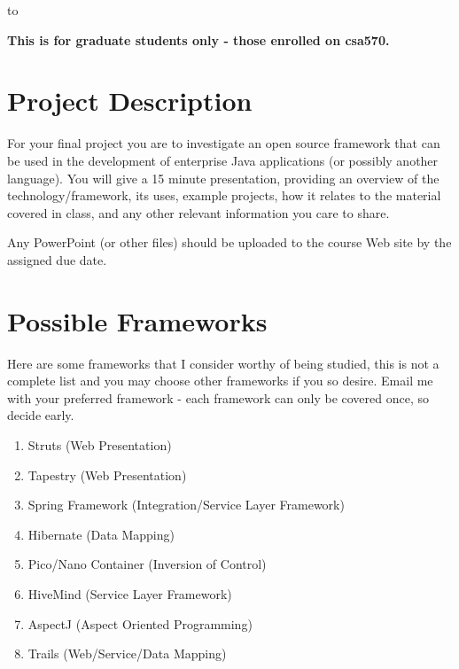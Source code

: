 \documentclass[11pt]{exam}
\begin{document}
\begin{center} 
\end{center}

\lstset{language=Python,numbers=left}

\vspace{0.1in} 
\hbox to \textwidth{Name:\enspace\hrulefill} 

{\bf This is for graduate students only - those enrolled on csa570.}

\section{Project Description}
For your final project you are to investigate an open source framework that can be used in the development of enterprise Java applications (or possibly another language).   You will give a 15 minute presentation, providing an overview of the technology/framework, its uses, example projects, how it relates to the material covered in class, and any other relevant information you care to share.
\par
Any PowerPoint (or other files) should be uploaded to the course Web site by the assigned due date.  

\section{Possible Frameworks}
Here are some frameworks that I consider worthy of being studied, this is not a complete list and you may choose other frameworks if you so desire.   Email me with your preferred framework - each framework can only be covered once, so decide early.    

\begin{enumerate}
	\item Struts (Web Presentation)
	\item Tapestry (Web Presentation)
	\item Spring Framework (Integration/Service Layer Framework)
	\item Hibernate (Data Mapping) 
	\item Pico/Nano Container (Inversion of Control)
	\item HiveMind (Service Layer Framework)
	\item AspectJ (Aspect Oriented Programming)
	\item Trails (Web/Service/Data Mapping)
\end{enumerate}
\end{document}
